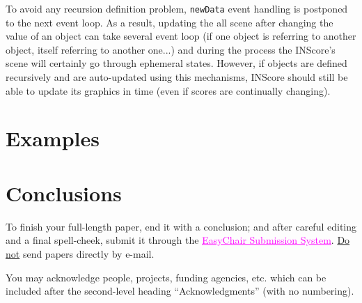 \documentclass{article}
\newenvironment{ExprCode}		{\vspace{-2mm} \small\verbatim}{\endverbatim\vs k pace{-2mm}}
\newcommand{\OSC}[1]{\texttt{#1}}
\begin{document}
To avoid any recursion definition problem, \OSC{newData} event handling is postponed to the next event loop. As a result, updating the all scene after changing the value of an object can take several event loop (if one object is referring to another object, itself referring to another one...) and during the process the INScore's scene will certainly go through ephemeral states. However, if objects are defined recursively and are auto-updated using this mechanisms, INScore should still be able to update its graphics in time (even if scores are continually changing).

\section{Examples}

\section{Conclusions}
To finish your full-length paper, end it with a conclusion;
and after careful editing and a final spell-cheek,
submit it through the \href{https://easychair.org/conferences/?conf=tenor2016}{\textcolor {magenta} {\underline {EasyChair Submission System}}}. 
\underline{Do not} send papers directly by e-mail.
%
\begin{acknowledgments}
You may acknowledge people, projects, 
funding agencies, etc. 
which can be included after the second-level heading
``Acknowledgments'' (with no numbering).
\end{acknowledgments} 



%               
%      
\end{document}
